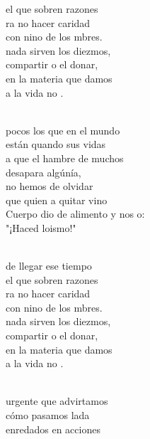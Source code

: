 \documentclass[12pt]{article}
\begin{document}
\begin{multicols*}{2}
\begin{cancion}
\begin{chorus}
	el que sobren razones\\
	ra no hacer caridad \\
	con nino de los mbres.\\
	nada sirven los diezmos,\\
	compartir o el donar,\\
	 en la materia que damos\\
	a la vida no .   \\
	\end{chorus}%
	\jump\\
	 pocos los que en el mundo \\
	están quando sus vidas\\
	a que el hambre de muchos \\
	desapara algúnía,\\
	 no hemos de olvidar \\
	que quien a quitar vino\\
	Cuerpo dio de alimento y nos o:\\
	"¡Haced loismo!"\\\jump\\
	\begin{chorus}%
	de llegar ese tiempo \\
	el que sobren razones\\
	ra no hacer caridad \\
	con nino de los mbres.\\
	nada sirven los diezmos,\\
	compartir o el donar,\\
	 en la materia que damos\\
	a la vida no .   \\
	\end{chorus}%
	\jump\\
	urgente que advirtamos \\
	cómo pasamos lada\\
enredados en acciones \\

\end{cancion}
\end{multicols*}
\end{document}
